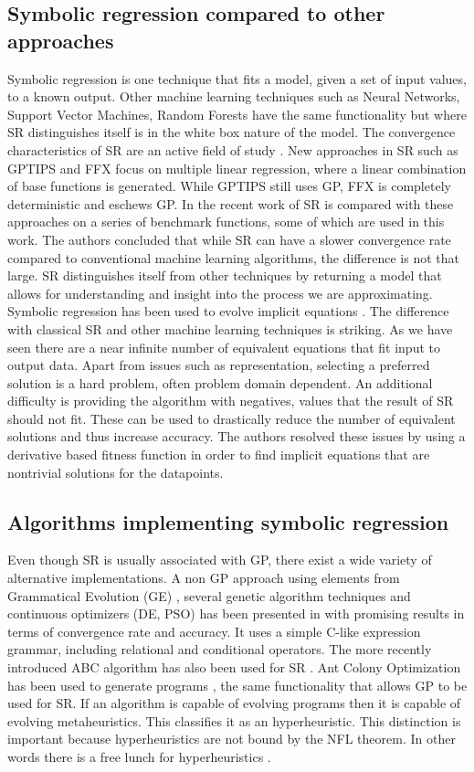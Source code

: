 \subsection{Symbolic regression compared to other approaches}
Symbolic regression is one technique that fits a model, given a set of input values, to a known output. Other machine learning techniques such as Neural Networks, Support Vector Machines, Random Forests have the same functionality but where SR distinguishes itself is in the white box nature of the model. The convergence characteristics of SR are an active field of study \citep{SRAccur}. New approaches in SR such as GPTIPS and FFX \citep{GPTIPS, FFX} focus on multiple linear regression, where a linear combination of base functions is generated. While GPTIPS still uses GP, FFX is completely deterministic and eschews GP.
In the recent work of \citep{SRlinear} SR is compared with these approaches on a series of benchmark functions, some of which are used in this work. The authors concluded that while SR can have a slower convergence rate compared to conventional machine learning algorithms, the difference is not that large. SR distinguishes itself from other techniques by returning a model that allows for understanding and insight into the process we are approximating.
Symbolic regression has been used to evolve implicit equations \citep{SRimplicit}. The difference with classical SR and other machine learning techniques is striking. As we have seen there are a near infinite number of equivalent equations that fit input to output data. Apart from issues such as representation, selecting a preferred solution is a hard problem, often problem domain dependent. An additional difficulty is providing the algorithm with negatives, values that the result of SR should not fit. These can be used to drastically reduce the number of equivalent solutions and thus increase accuracy. The authors resolved these issues by using a derivative based fitness function in order to find implicit equations that are nontrivial solutions for the datapoints.

\subsection{Algorithms implementing symbolic regression}
Even though SR is usually associated with GP, there exist a wide variety of alternative implementations.
A non GP approach using elements from Grammatical Evolution (GE) \cite{GE}, several genetic algorithm techniques and continuous optimizers (DE, PSO) has been presented in \citep{AEG} with promising results in terms of convergence rate and accuracy. 
It uses a simple C-like expression grammar, including relational and conditional operators. 
The more recently introduced ABC algorithm has also been used for SR \cite{ABCSR}. 
Ant Colony Optimization \citep{ACO} has been used to generate programs \citep{ACOSR}, the same functionality that allows GP to be used for SR.
If an algorithm is capable of evolving programs then it is capable of evolving metaheuristics. This classifies it as an hyperheuristic. This distinction is important because hyperheuristics are not bound by the NFL theorem. In other words there is a free lunch for hyperheuristics \cite{HyperNFL}. 

